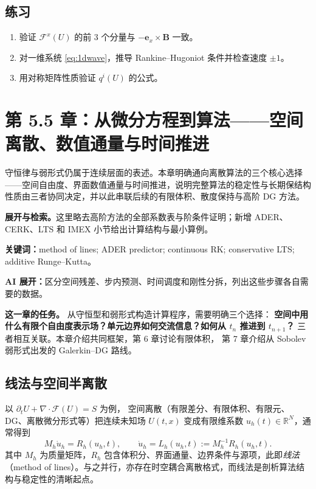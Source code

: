 \documentclass[UTF8,11pt,openany]{ctexbook}
\numberwithin{equation}{chapter}
\theoremstyle{definition}
\theoremstyle{remark}
\newcommand{\RR}{\mathbb R}
\newcommand{\studyroute}[3]{%
  \par\smallskip\noindent\textbf{展开与检索。}#1\par
  \noindent\textbf{关键词：}#2。\par
  \noindent\textbf{AI 展开：}#3\par
}
\begin{document}
\section{练习}
\begin{enumerate}
\item 验证 $\mathcal F^x(U)$ 的前 3 个分量与 $-\bm e_x\times\bm B$ 一致。
\item 对一维系统 \eqref{eq:1dwave}，推导 Rankine--Hugoniot 条件并检查速度 $\pm1$。
\item 用对称矩阵性质验证 $q^i(U)$ 的公式。
\end{enumerate}


\begingroup
\chapter*{第 5.5 章：从微分方程到算法——空间离散、数值通量与时间推进}
{}
\setcounter{section}{0}
\renewcommand{\thesection}{5.5.\arabic{section}}
\renewcommand{\thesubsection}{5.5.\arabic{section}.\arabic{subsection}}
\renewcommand{\theHsection}{bridge.\arabic{section}}
\setcounter{equation}{0}
\renewcommand{\theequation}{5.5.\arabic{equation}}
\renewcommand{\theHequation}{bridge.\arabic{equation}}
\label{ch:bridge}

\begin{chaptersummary}
守恒律与弱形式仍属于连续层面的表述。本章明确通向离散算法的三个核心选择——空间自由度、界面数值通量与时间推进，说明完整算法的稳定性与长期保结构性质由三者协同决定，并以此串联后续的有限体积、散度保持与高阶 DG 方法。
\end{chaptersummary}
\studyroute{这里略去高阶方法的全部系数表与阶条件证明；新增 ADER、CERK、LTS 和 IMEX 小节给出计算结构与最小算例。}{method of lines; ADER predictor; continuous RK; conservative LTS; additive Runge--Kutta}{区分空间残差、步内预测、时间调度和刚性分拆，列出这些步骤各自需要的数据。}

\noindent\textbf{这一章的任务。}
从守恒型和弱形式构造计算程序，需要明确三个选择：
\textbf{空间中用什么有限个自由度表示场？单元边界如何交流信息？如何从 $t_n$ 推进到 $t_{n+1}$？}
三者相互关联。本章介绍共同框架，第 6 章讨论有限体积，
第 7 章介绍从 Sobolev 弱形式出发的 Galerkin--DG 路线。

\section{线法与空间半离散}
以 $\partial_t U+\nabla\cdot\mathcal F(U)=S$ 为例，
空间离散（有限差分、有限体积、有限元、DG、离散微分形式等）把连续未知场 $U(t,x)$
变成有限维系数 $u_h(t)\in\RR^N$，通常得到
\begin{equation}\label{eq:mol}
M_h\dot u_h=R_h(u_h,t),\qquad
\dot u_h=L_h(u_h,t):=M_h^{-1}R_h(u_h,t).
\end{equation}
其中 $M_h$ 为质量矩阵，$R_h$ 包含体积分、界面通量、边界条件与源项，此即\emph{线法}（method of lines）。与之并行，亦存在时空耦合离散格式，而线法是剖析算法结构与稳定性的清晰起点。
\end{document}
